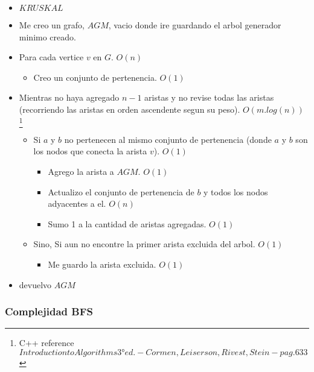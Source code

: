 \begin{itemize}
\item $KRUSKAL$
\item Me creo un grafo, $AGM$, vacio donde ire guardando el arbol generador minimo creado.
\item Para cada vertice $v$ en $G$. $O(n)$
\begin{itemize}
	\item Creo un conjunto de pertenencia. $O(1)$
\end{itemize}
\item Mientras no haya agregado $n-1$ aristas y no revise todas las aristas (recorriendo las aristas en orden ascendente segun su peso). $O(m.log(n))$ \footnote{C++ reference $Introduction to Algorithms 3° ed. - Cormen, Leiserson, Rivest, Stein - pag. 633$}
\begin{itemize}
	\item Si $a$ y $b$ no pertenecen al mismo conjunto de pertenencia (donde $a$ y $b$ son los nodos que conecta la arista $v$). $O(1)$
	\begin{itemize}
		\item Agrego la arista a $AGM$. $O(1)$
		\item Actualizo el conjunto de pertenencia de $b$ y todos los nodos adyacentes a el. $O(n)$ 
		\item Sumo 1 a la cantidad de aristas agregadas. $O(1)$
	\end{itemize}
	\item Sino, Si aun no encontre la primer arista excluida del arbol. $O(1)$
	\begin{itemize}
		\item Me guardo la arista excluida. $O(1)$
	\end{itemize}
\end{itemize}
\item devuelvo $AGM$
\end{itemize}


\subsubsection{Complejidad BFS}

